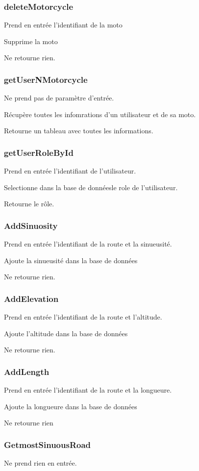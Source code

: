 \documentclass[a4paper]{article}
\newcommand{\bdd}{base de données}
\begin{document}
\subsubsection{deleteMotorcycle}
Prend en entrée l'identifiant de la moto

Supprime la moto

Ne retourne rien.

\subsubsection{getUserNMotorcycle}
Ne prend pas de paramètre d'entrée.

Récupère toutes les infomrations d'un utilisateur et de sa moto.

Retourne un tableau avec toutes les informations.


\subsubsection{getUserRoleById}
Prend en entrée l'identifiant de l'utilisateur.

Selectionne dans la \bdd le role de l'utilisateur.

Retourne le rôle.

\subsubsection{AddSinuosity}
Prend en entrée l'identifiant de la route et la sinueusité.

Ajoute la sinueusité dans la \bdd

Ne retourne rien.

\subsubsection{AddElevation}
Prend en entrée l'identifiant de la route et l'altitude.

Ajoute l'altitude dans la \bdd

Ne retourne rien.

\subsubsection{AddLength}
Prend en entrée l'identifiant de la route et la longueure.

Ajoute la longueure dans la \bdd

Ne retourne rien

\subsubsection{GetmostSinuousRoad}
Ne prend rien en entrée.
\end{document}
